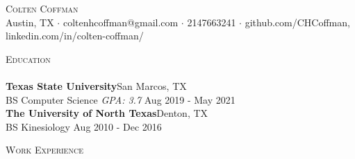 \documentclass[a4paper]{article}
\newcommand{\lineunder} {
    \vspace*{-8pt} \\
    \hspace*{-18pt} \hrulefill \\
}
\newcommand{\header} [1] {
    {\hspace*{-18pt}\vspace*{6pt} \textsc{#1}}
    \vspace*{-6pt} \lineunder
}
\begin{document}
\vspace*{-40pt}

    

\vspace*{-10pt}
\begin{center}
	{\Huge \scshape {Colten Coffman}}\\
	Austin, TX $\cdot$ coltenhcoffman@gmail.com $\cdot$ 2147663241 $\cdot$ github.com/CHCoffman, linkedin.com/in/colten-coffman/\\
\end{center}

\header{Education}
\textbf{Texas State University}\hfill San Marcos, TX\\
BS Computer Science \textit{GPA: 3.7} \hfill Aug 2019 - May 2021\\
\vspace{2mm}
\textbf{The University of North Texas}\hfill Denton, TX\\
BS Kinesiology \hfill Aug 2010 - Dec 2016\\
\vspace{2mm}

\header{Work Experience}
\vspace{1mm}
\end{document}
